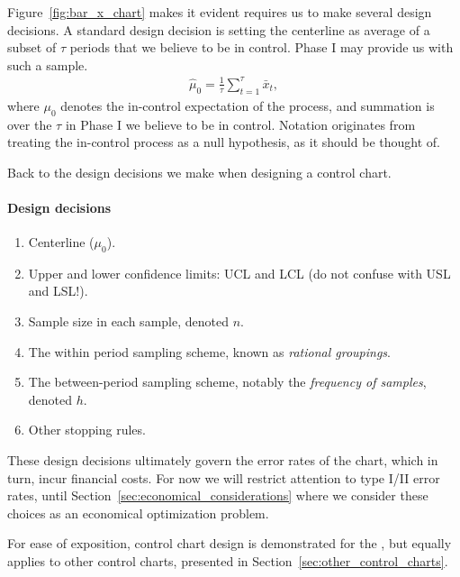 Figure~\ref{fig:bar_x_chart} makes it evident \barxChart requires us to make several design decisions.
A standard design decision is setting the centerline as average of a subset of $\tau$ periods that we believe to be in control. Phase I may provide us with such a sample.
\begin{align}
\label{eq:centerline}
	\hat{\mu}_0=\frac 1\tau \sum_{t=1}^\tau \bar{x}_t,
\end{align}
where $\mu_0$ denotes the in-control expectation of the process, and summation is over the $\tau$ in Phase I we believe to be in control.
Notation originates from treating the in-control process as a null hypothesis, as it should be thought of.

\bigskip

Back to the design decisions we make when designing a control chart.
\begin{tcolorbox}[breakable]
\paragraph{Design decisions}
\begin{enumerate}
\item Centerline ($\mu_0$).
\item Upper and lower confidence limits: UCL and LCL (do not confuse with USL and LSL!).
\item Sample size in each sample, denoted $n$.
\item The within period sampling scheme, known as \emph{rational groupings}.
\item The between-period sampling scheme, notably the \emph{frequency of samples}, denoted $h$. 
\item Other stopping rules.
\end{enumerate}
\end{tcolorbox}

These design decisions ultimately govern the error rates of the chart, which in turn, incur financial costs. 
For now we will restrict attention to type I/II error rates, until Section~\ref{sec:economical_considerations} where we consider these choices as an economical optimization problem.

For ease of exposition, control chart design is demonstrated for the \barxChart, but equally applies to other control charts, presented in Section~\ref{sec:other_control_charts}.


